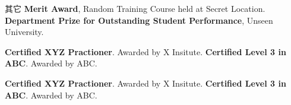 \begin{rubric}{其它}
\entry*[2002] \textbf{Merit Award}, Random Training Course held at Secret Location.
%
\entry*[2001] \textbf{Department Prize for Outstanding Student Performance}, Unseen University.

\entry*[2014] \textbf{Certified XYZ Practioner}. Awarded by X Insitute.
\entry*[2006] \textbf{Certified Level 3 in ABC}. Awarded by ABC.

\entry*[2014] \textbf{Certified XYZ Practioner}. Awarded by X Insitute.
\entry*[2006] \textbf{Certified Level 3 in ABC}. Awarded by ABC.

\end{rubric}